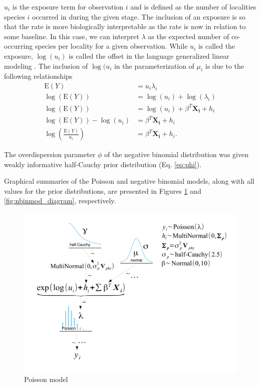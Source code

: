 \documentclass[12pt,letterpaper]{article}
\begin{document}
\(u_{i}\) is the exposure term for observation \(i\) and is defined as the number of localities species \(i\) occurred in during the given stage. The inclusion of an exposure is so that the rate is more biologically interpretable as the rate is now in relation to some baseline. In this case, we can interpret \(\lambda\) as the expected number of co-occurring species per locality for a given observation. While \(u_{i}\) is called the exposure, \(\log(u_{i})\) is called the offset in the language generalized linear modeling \citep{Gelman2007}. The inclusion of \(\log(u_{i}\) in the parameterization of \(\mu_{i}\) is due to the following relationships 
\begin{align*}
  \mathrm{E}(Y) &= u_{i}\lambda_{i} \\
  \log(\mathrm{E}(Y)) &= \log(u_{i}) + \log(\lambda_{i}) \\
  \log(\mathrm{E}(Y)) &= \log(u_{i}) + \beta^{T}\mathbf{X_{i}} + h_{i} \\
  \log(\mathrm{E}(Y)) - \log(u_{i}) &= \beta^{T}\mathbf{X_{i}} + h_{i} \\
  \log\left(\frac{\mathrm{E}(Y)}{u_{i}}\right) &= \beta^{T}\mathbf{X_{i}} + h_{i}.
\end{align*}

The overdispersion parameter \(\phi\) of the negative binomial distribution was given weakly informative half-Cauchy prior distribution (Eq. \ref{eq:phi}).

Graphical summaries of the Poisson and negative binomial models, along with all values for the prior distributions, are presented in Figures \ref{fig:poismod_diagram} and \ref{fig:nbinmod_diagram}, respectively.
\begin{figure}[ht]
  \centering
  \includegraphics[height = 0.5\textheight, width = \textwidth, keepaspectratio = true]{figure/mammal_degree_model}
  \caption{Poisson model}
  \label{fig:poismod_diagram}
\end{figure}
\end{document}
